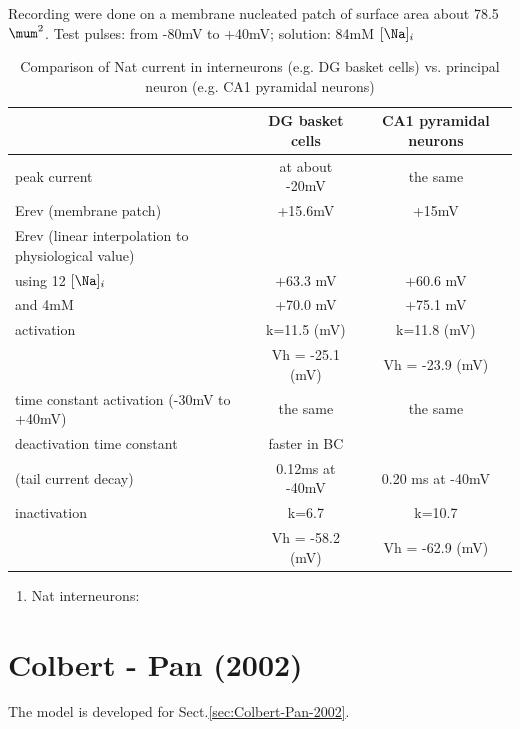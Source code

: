 Recording were done on a membrane nucleated patch of surface area about 78.5
$\mum^2$. Test pulses: from -80mV to +40mV; solution: 84mM $[\Na]_i$

\begin{table}[hbt]
\begin{center}
    \begin{tabular}{lcc}
        \hline
        & DG basket cells &  CA1 pyramidal neurons \\
        \hline \hline
        peak current & at about -20mV & the same \\
        Erev (membrane patch) & +15.6mV & +15mV \\
        Erev (linear interpolation to physiological value) & \\
        using 12 $[\Na]_i$ & +63.3 mV & +60.6 mV  \\
         and 4mM  & +70.0 mV & +75.1 mV \\
        \hline
        activation & k=11.5 (mV) & k=11.8 (mV) \\
        & Vh = -25.1 (mV) & Vh = -23.9 (mV) \\
        \hline
        time constant activation (-30mV to +40mV) &  the same & the same \\
        \hline
        deactivation time constant  & faster in BC & \\
        (tail current decay) &  0.12ms at -40mV & 0.20 ms at -40mV \\
        \hline
        inactivation & k=6.7 & k=10.7 \\
        & Vh = -58.2 (mV) & Vh = -62.9 (mV) \\
        \hline
    \end{tabular}
\end{center}
\caption{Comparison of Nat current in interneurons (e.g. DG basket cells) vs.
principal neuron (e.g. CA1 pyramidal neurons)}
\label{tab:Nat-interneuron-vs-pyramidal-neuron}
\end{table}

\begin{enumerate}
  \item Nat interneurons: 
\end{enumerate}


\section{Colbert - Pan (2002)}
\label{sec:NaT-Colbert-2002}

The  model is developed for Sect.\ref{sec:Colbert-Pan-2002}.

